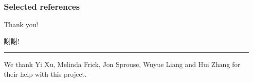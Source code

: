 \documentclass{beamer}
\begin{document}
\begin{frame}[shrink=15]
\frametitle{Selected references}

\nocite{*}   %



\end{frame}



\begin{frame}
\Huge{\centerline{Thank you!}}
\begin{CJK*}{UTF8}{bsmi}
\Huge{\centerline{謝謝!}}
\end{CJK*}
\vspace{10mm}
\noindent\rule{\textwidth}{1pt}
\fontsize{10pt}{12pt}\selectfont
\begin{center}
    We thank Yi Xu, Melinda Frick, Jon Sprouse, Wuyue Liang and Hui Zhang for their help with this project.
\end{center}
    
\end{frame}

\end{document}
